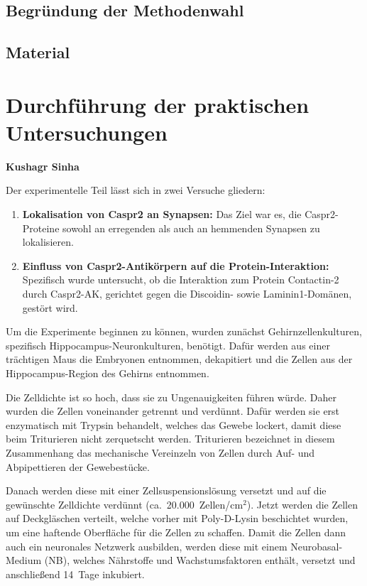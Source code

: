 \documentclass[a4paper, 12pt]{scrreprt}
\begin{document}
    \section{Begründung der Methodenwahl}
    \section{Material}

\chapter{Durchführung der praktischen Untersuchungen}
\textbf{Kushagr Sinha}


Der experimentelle Teil lässt sich in zwei Versuche gliedern:

\begin{enumerate}
	\item \textbf{Lokalisation von Caspr2 an Synapsen:} Das Ziel war es,
	die Caspr2-Proteine sowohl an erregenden als auch an
	hemmenden Synapsen zu lokalisieren.
	\item \textbf{Einfluss von Caspr2-Antikörpern auf die
		Protein-Interaktion:} Spezifisch wurde untersucht, ob die
	Interaktion zum Protein Contactin-2 durch Caspr2-AK, gerichtet
	gegen die Discoidin- sowie Laminin1-Domänen, gestört wird.
\end{enumerate}

Um die Experimente beginnen zu können, wurden zunächst
Gehirnzellenkulturen, spezifisch Hippocampus-Neuronkulturen, benötigt. Dafür
werden aus einer trächtigen Maus die Embryonen entnommen, dekapitiert
und die Zellen aus der Hippocampus-Region des Gehirns entnommen.

Die Zelldichte ist so hoch, dass sie zu Ungenauigkeiten führen würde. Daher wurden die Zellen voneinander getrennt und verdünnt. Dafür
werden sie erst enzymatisch mit Trypsin behandelt, welches das Gewebe
lockert, damit diese beim Triturieren nicht zerquetscht werden.
Triturieren bezeichnet in diesem Zusammenhang das mechanische Vereinzeln
von Zellen durch Auf- und Abpipettieren der Gewebestücke.

Danach werden diese mit einer Zellsuspensionslösung versetzt und auf die
gewünschte Zelldichte verdünnt (ca.\ 20.000~Zellen/cm$^2$). Jetzt
werden die Zellen auf Deckgläschen verteilt, welche vorher mit
Poly-D-Lysin beschichtet wurden, um eine haftende Oberfläche für die
Zellen zu schaffen. Damit die Zellen dann auch ein neuronales Netzwerk
ausbilden, werden diese mit einem Neurobasal-Medium (NB), welches
Nährstoffe und Wachstumsfaktoren enthält, versetzt und anschließend 14~Tage
inkubiert.
\end{document}

